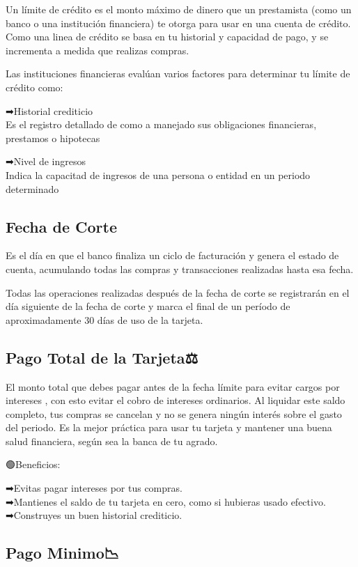 \documentclass[
  letterpaper,
  DIV=11,
  numbers=noendperiod]{scrartcl}
\begin{document}
Un límite de crédito es el monto máximo de dinero que un prestamista
(como un banco o una institución financiera) te otorga para usar en una
cuenta de crédito. Como una linea de crédito se basa en tu historial y
capacidad de pago, y se incrementa a medida que realizas compras.

Las instituciones financieras evalúan varios factores para determinar tu
límite de crédito como:

➡Historial crediticio\\
Es el registro detallado de como a manejado sus obligaciones
financieras, prestamos o hipotecas

➡Nivel de ingresos\\
Indica la capacitad de ingresos de una persona o entidad en un periodo
determinado

\subsection{Fecha de Corte📆}\label{fecha-de-corte}

Es el día en que el banco finaliza un ciclo de facturación y genera el
estado de cuenta, acumulando todas las compras y transacciones
realizadas hasta esa fecha.

Todas las operaciones realizadas después de la fecha de corte se
registrarán en el día siguiente de la fecha de corte y marca el final de
un período de aproximadamente 30 días de uso de la tarjeta.

\subsection{Pago Total de la Tarjeta⚖️}\label{pago-total-de-la-tarjeta}

El monto total que debes pagar antes de la fecha límite para evitar
cargos por intereses , con esto evitar el cobro de intereses ordinarios.
Al liquidar este saldo completo, tus compras se cancelan y no se genera
ningún interés sobre el gasto del periodo. Es la mejor práctica para
usar tu tarjeta y mantener una buena salud financiera, según sea la
banca de tu agrado.

🟢Beneficios:

➡Evitas pagar intereses por tus compras.\\
➡Mantienes el saldo de tu tarjeta en cero, como si hubieras usado
efectivo.\\
➡Construyes un buen historial crediticio.

\subsection{Pago Minimo📉}\label{pago-minimo}
\end{document}
